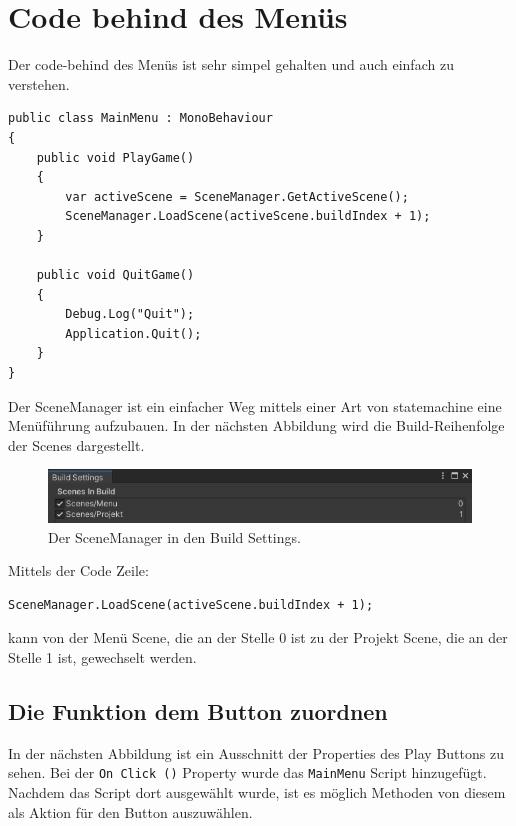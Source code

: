 \section{Code behind des Menüs}

Der \gls{code-behind} des Menüs ist sehr simpel gehalten und auch einfach zu verstehen.

\begin{lstlisting}[language=CSharp,caption={Main Menu Klasse.},label=code:mainmenu]
public class MainMenu : MonoBehaviour
{
    public void PlayGame()
    {
        var activeScene = SceneManager.GetActiveScene();
        SceneManager.LoadScene(activeScene.buildIndex + 1);
    }

    public void QuitGame()
    {
        Debug.Log("Quit");
        Application.Quit();
    }
}
\end{lstlisting}
Der SceneManager ist ein einfacher Weg mittels einer Art von \gls{statemachine} eine Menüführung aufzubauen. In der nächsten Abbildung wird die Build-Reihenfolge der Scenes dargestellt.

\begin{center}
    \begin{figure}[h]
        \centering
        \includegraphics*[width=1\textwidth]{chapters/03/images/SceneManager.png}
        \caption{Der SceneManager in den Build Settings.}
        \label{htl04}
    \end{figure}
\end{center}

\noindent
Mittels der Code Zeile: 
\begin{lstlisting}[language=CSharp]
    SceneManager.LoadScene(activeScene.buildIndex + 1);
\end{lstlisting}
kann von der Menü Scene, die an der Stelle 0 ist zu der Projekt Scene, die an der Stelle 1 ist, gewechselt werden.

\pagebreak

\subsection{Die Funktion dem Button zuordnen}

In der nächsten Abbildung ist ein Ausschnitt der Properties des Play Buttons zu sehen. Bei der \verb+On Click ()+ Property wurde das \verb+MainMenu+ Script hinzugefügt. Nachdem das Script dort ausgewählt wurde, ist es möglich Methoden von diesem als Aktion für den Button auszuwählen. 

